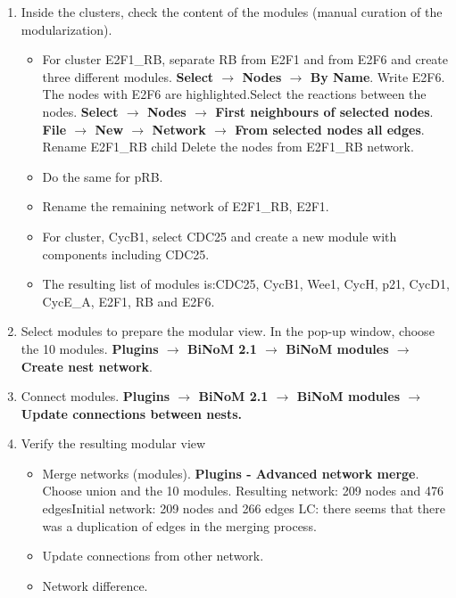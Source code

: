 \documentclass[a4paper,10pt]{article}
\begin{document}
\begin{enumerate}
\item	Inside the clusters, check the content of the modules (manual curation
of the modularization).

\begin{itemize}
\item	For cluster E2F1\_RB, separate RB from E2F1 and from E2F6 and create
three different modules. \textbf{Select $\rightarrow$ Nodes $\rightarrow$ By Name}. Write E2F6. The
nodes with E2F6 are highlighted.Select the reactions between the nodes.
\textbf{Select $\rightarrow$ Nodes $\rightarrow$ First neighbours of selected nodes}. \textbf{File $\rightarrow$ New
 $\rightarrow$ Network $\rightarrow$ From selected nodes all edges}. Rename E2F1\_RB child Delete the
nodes from E2F1\_RB network.
\item	Do the same for pRB.
\item	Rename the remaining network of E2F1\_RB, E2F1.
\item	For cluster, CycB1, select CDC25 and create a new module with components
including CDC25.
\item	The resulting list of modules is:CDC25, CycB1, Wee1, CycH, p21, CycD1,
CycE\_A, E2F1, RB and E2F6.
\end{itemize}

\item	Select modules to prepare the modular view. In the pop-up window, choose
the 10 modules. \textbf{Plugins $\rightarrow$  BiNoM 2.1 $\rightarrow$ BiNoM modules $\rightarrow$ Create nest network}.
\item	Connect modules. \textbf{Plugins $\rightarrow$  BiNoM 2.1 $\rightarrow$ BiNoM modules $\rightarrow$ Update connections between
nests.}
\item   Verify the resulting modular view

\begin{itemize}
\item	Merge networks (modules). \textbf{Plugins - Advanced network merge}.
Choose union and the 10 modules. Resulting network: 209 nodes and 476
edgesInitial network: 209 nodes and 266 edges LC: there seems that there was a
duplication of edges in the merging process.
\item	Update connections from other network.
\item	Network difference.
\end{itemize}

\end{enumerate}
\end{document}
